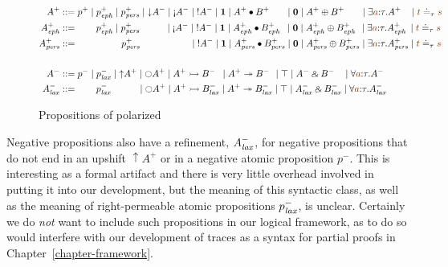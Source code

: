 \begin{figure}
{\footnotesize \begin{align*}
A^+ & ::= p^+ \mid p^+_\meph \mid p^+_\mpers
        \mid {\downarrow}A^- \mid {\gnab}A^- \mid {!}A^- 
        \mid \one \mid A^+ \fuse B^+ \hspace{17pt}
        \mid \zero \mid A^+ \oplus B^+  \hspace{17pt}
        \mid \exists \lf a{:}\tau. A^+ \hspace{9pt}
        \mid \lf{t} \doteq_\tau \lf{s}
\\
A^+_\meph & ::= \hspace{20pt} p^+_\meph \mid p^+_\mpers
        \hspace{27pt} \mid {\gnab}A^- \mid {!}A^- 
        \mid \one \mid A^+_\meph \fuse B^+_\meph \hspace{5pt}
        \mid \zero \mid A^+_\meph \oplus B^+_\meph \hspace{4pt}
        \mid \exists \lf a{:}\tau. A^+_\meph \hspace{2pt} 
        \mid \lf{t} \doteq_\tau \lf{s}
\\
A^+_\mpers & ::= \hspace{47pt} p^+_\mpers 
         \hspace{53pt} \mid {!}A^- 
        \mid \one \mid A^+_\mpers \fuse B^+_\mpers 
        \mid \zero \mid A^+_\mpers \oplus B^+_\mpers
        \mid \exists \lf a{:}\tau. A^+_\mpers \mid \lf{t} \doteq_\tau \lf{s}
\\
\\
A^- & ::= p^- \mid p^-_\mlax 
        \mid {\uparrow}A^+ \mid {\ocircle}A^+
        \mid A^+ \lefti B^- \hspace{5pt} \mid A^+ \righti B^- \hspace{4pt}
        \mid \top \mid A^- \with B^- \hspace{9pt}
        \mid \forall \lf a{:}\tau.A^-
\\
A^-_\mlax & ::= \hspace{20pt} p^-_\mlax \hspace{28pt}
        \mid {\ocircle}A^+
        \mid A^+ \lefti B^-_\mlax \mid A^+ \righti B^-_\mlax
        \mid \top \mid A^-_\mlax \with B^-_\mlax
        \mid \forall \lf a{:}\tau.A^-_\mlax
\end{align*}}\vspace{-12pt}
\caption{Propositions of polarized \ollll}
\label{fig:ordered}
\end{figure}

Negative propositions also have a refinement, $A^-_{\it lax}$, for
negative propositions that do not end in an upshift ${\uparrow}A^+$ or
in a negative atomic proposition $p^-$.  This is interesting as a
formal artifact and there is very little overhead involved in putting
it into our development, but the meaning of this 
syntactic class, as well as the
meaning of right-permeable atomic propositions $p^-_{\it lax}$, is
unclear.  Certainly we do {\it not} want to include such propositions
in our logical framework, as to do so would interfere with our
development of traces as a syntax for partial proofs in
Chapter~\ref{chapter-framework}.

